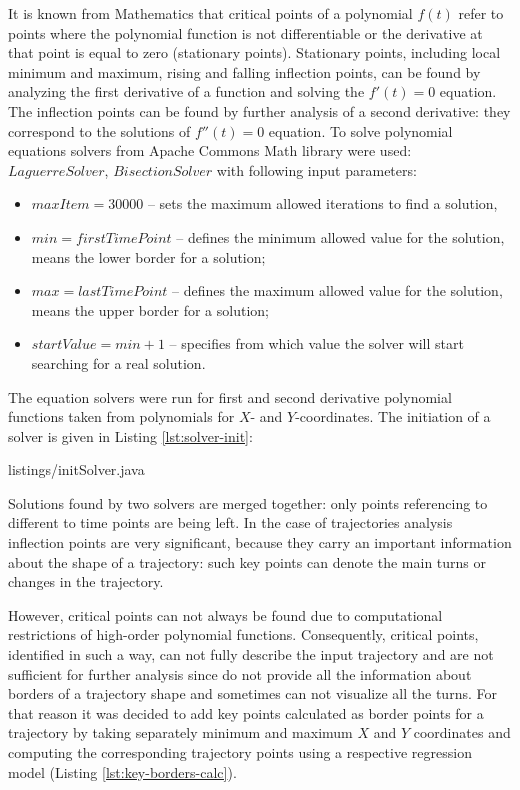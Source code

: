 It is known from Mathematics that critical points of a polynomial $f(t)$ refer to points where the polynomial function is not differentiable or the derivative at that point is equal to zero (stationary points). Stationary points, including local minimum and maximum, rising and falling inflection points, can be found by analyzing the first derivative of a function and solving the $f'(t) = 0$ equation. The inflection points can be found by further analysis of a second derivative: they correspond to the solutions of $f''(t) = 0$ equation. To solve polynomial equations solvers from Apache Commons Math library were used: $LaguerreSolver$, $BisectionSolver$ with following input parameters:

\begin{itemize}
	\setlength\itemsep{0em}
	\item $maxItem = 30000$ -- sets the maximum allowed iterations to find a solution,
	\item $min = firstTimePoint$ -- defines the minimum allowed value for the solution, means the lower border for a solution;
	\item $max = lastTimePoint$ -- defines the maximum allowed value for the solution, means the upper border for a solution;
	\item $startValue = min + 1$ -- specifies from which value the solver will start searching for a real solution.
\end{itemize}

The equation solvers were run for first and second derivative polynomial functions taken from polynomials for $X$- and $Y$-coordinates. The initiation of a solver is given in Listing \ref{lst:solver-init}:

 {listings/initSolver.java}

Solutions found by two solvers are merged together: only points referencing to different to time points are being left. In the case of trajectories analysis inflection points are very significant, because they carry an important information about the shape of a trajectory: such key points can denote the main turns or changes in the trajectory.

However, critical points can not always be found due to computational restrictions of high-order polynomial functions. Consequently, critical points, identified in such a way, can not fully describe the input trajectory and are not sufficient for further analysis since do not provide all the information about borders of a trajectory shape and sometimes can not visualize all the turns. For that reason it was decided to add key points calculated as border points for a trajectory by taking separately minimum and maximum $X$ and $Y$ coordinates and computing the corresponding trajectory points using a respective regression model (Listing \ref{lst:key-borders-calc}).

